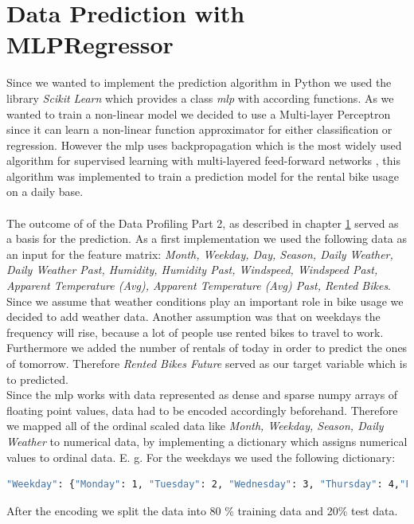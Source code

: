 
\section{Data Prediction with MLPRegressor}\label{sec:mlp}
Since we wanted to implement the prediction algorithm in Python we used the library \emph{Scikit Learn} which provides a class \emph{\acf{mlp}} with according functions.
As we wanted to train a non-linear model we decided to use a Multi-layer Perceptron since it can learn a non-linear function approximator for either classification or regression. However  the \acs{mlp} uses backpropagation which is the most widely used algorithm for supervised learning with multi-layered feed-forward networks \cite{riedmiller1993direct}, this algorithm was implemented to train a prediction model for the rental bike usage on a daily base.\\\\
The outcome of of the Data Profiling Part 2, as described in chapter \ref{sec:mlp} served as a basis for the prediction.
As a first implementation we used the following data as an input for the feature matrix: \emph{Month, Weekday, Day, Season, Daily Weather, Daily Weather Past, Humidity, Humidity Past, Windspeed, Windspeed Past, Apparent Temperature (Avg), Apparent Temperature (Avg) Past, Rented Bikes}. Since we assume that weather conditions play an important role in bike usage we decided to add weather data. Another assumption was that on weekdays the frequency will rise, because a lot of people use rented bikes to travel to work. Furthermore we added the number of rentals of today in order to predict the ones of tomorrow. Therefore \emph{Rented Bikes Future} served as our target variable which is to predicted.\\
Since the \acs{mlp} works with data represented as dense and sparse numpy arrays of floating point values, data had to be encoded accordingly beforehand. Therefore we mapped all of the ordinal scaled data like \emph{Month, Weekday, Season, Daily Weather} to numerical data, by implementing a dictionary which assigns numerical values to ordinal data. E. g. For the weekdays we used the following dictionary:
\begin{lstlisting}[language=bash,breaklines=true]
"Weekday": {"Monday": 1, "Tuesday": 2, "Wednesday": 3, "Thursday": 4,"Friday": 5, "Saturday": 6, "Sunday":7 }
\end{lstlisting}
After the encoding we split the data into 80 \% training data and 20\% test data.
